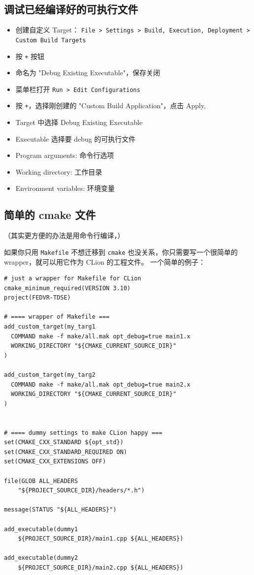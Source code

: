 \subsection{调试已经编译好的可执行文件}\label{sub_CLionN_1}
\begin{itemize}
\item 创建自定义 Target： \verb`File > Settings > Build, Execution, Deployment > Custom Build Targets`
\item 按 \verb`+` 按钮
\item 命名为 "Debug Existing Executable"，保存关闭
\item 菜单栏打开 \verb`Run > Edit Configurations`
\item 按 \verb`+`，选择刚创建的 "Custom Build Application"，点击 Apply,
\item Target 中选择 Debug Existing Executable
\item Executable 选择要 debug 的可执行文件
\item Program arguments: 命令行选项
\item Working directory: 工作目录
\item Environment variables: 环境变量
\end{itemize}

\subsection{简单的 cmake 文件}
（其实更方便的办法是用命令行编译，）

如果你只用 \verb`Makefile` 不想迁移到 \verb`cmake` 也没关系，你只需要写一个很简单的 wrapper，就可以用它作为 CLion 的工程文件。 一个简单的例子：
\begin{lstlisting}[language=none]
# just a wrapper for Makefile for CLion
cmake_minimum_required(VERSION 3.10)
project(FEDVR-TDSE)

# ==== wrapper of Makefile ===
add_custom_target(my_targ1
  COMMAND make -f make/all.mak opt_debug=true main1.x
  WORKING_DIRECTORY "${CMAKE_CURRENT_SOURCE_DIR}"
)

add_custom_target(my_targ2
  COMMAND make -f make/all.mak opt_debug=true main2.x
  WORKING_DIRECTORY "${CMAKE_CURRENT_SOURCE_DIR}"
)


# ==== dummy settings to make CLion happy ===
set(CMAKE_CXX_STANDARD ${opt_std})
set(CMAKE_CXX_STANDARD_REQUIRED ON)
set(CMAKE_CXX_EXTENSIONS OFF)

file(GLOB ALL_HEADERS
    "${PROJECT_SOURCE_DIR}/headers/*.h")

message(STATUS "${ALL_HEADERS}")

add_executable(dummy1
    ${PROJECT_SOURCE_DIR}/main1.cpp ${ALL_HEADERS})

add_executable(dummy2
    ${PROJECT_SOURCE_DIR}/main2.cpp ${ALL_HEADERS})
\end{lstlisting}

